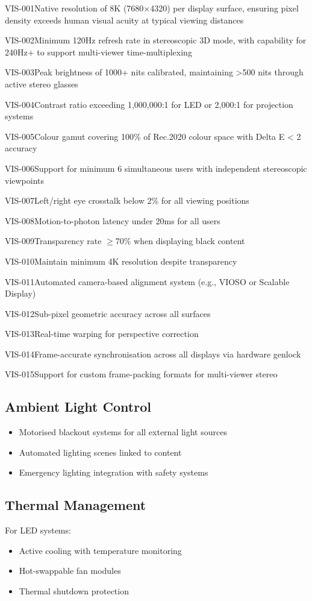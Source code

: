 \begin{requirement}{VIS-001}{Native resolution of 8K (7680×4320) per display surface, ensuring pixel density exceeds human visual acuity at typical viewing distances}
\begin{requirement}{VIS-002}{Minimum 120Hz refresh rate in stereoscopic 3D mode, with capability for 240Hz+ to support multi-viewer time-multiplexing}
\begin{requirement}{VIS-003}{Peak brightness of 1000+ nits calibrated, maintaining >500 nits through active stereo glasses}
\begin{requirement}{VIS-004}{Contrast ratio exceeding 1,000,000:1 for LED or 2,000:1 for projection systems}
\begin{requirement}{VIS-005}{Colour gamut covering 100\% of Rec.2020 colour space with Delta E < 2 accuracy}
\begin{requirement}{VIS-006}{Support for minimum 6 simultaneous users with independent stereoscopic viewpoints}
\begin{requirement}{VIS-007}{Left/right eye crosstalk below 2\% for all viewing positions}
\begin{requirement}{VIS-008}{Motion-to-photon latency under 20ms for all users}
\begin{requirement}{VIS-009}{Transparency rate $\ge$70\% when displaying black content}
\begin{requirement}{VIS-010}{Maintain minimum 4K resolution despite transparency}
\begin{requirement}{VIS-011}{Automated camera-based alignment system (e.g., VIOSO or Scalable Display)}
\begin{requirement}{VIS-012}{Sub-pixel geometric accuracy across all surfaces}
\begin{requirement}{VIS-013}{Real-time warping for perspective correction}
\begin{requirement}{VIS-014}{Frame-accurate synchronisation across all displays via hardware genlock}
\begin{requirement}{VIS-015}{Support for custom frame-packing formats for multi-viewer stereo}
\subsection{Ambient Light Control}

\begin{itemize}
    \item Motorised blackout systems for all external light sources
    \item Automated lighting scenes linked to content
    \item Emergency lighting integration with safety systems
\end{itemize}

\subsection{Thermal Management}

For LED systems:
\begin{itemize}
    \item Active cooling with temperature monitoring
    \item Hot-swappable fan modules
    \item Thermal shutdown protection
\end{itemize}


\end{requirement}
\end{requirement}
\end{requirement}
\end{requirement}
\end{requirement}
\end{requirement}
\end{requirement}
\end{requirement}
\end{requirement}
\end{requirement}
\end{requirement}
\end{requirement}
\end{requirement}
\end{requirement}
\end{requirement}
